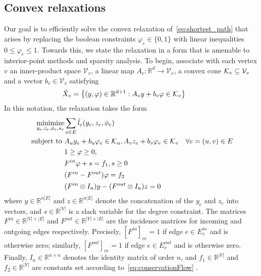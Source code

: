 \documentclass[letterpaper, 11pt]{article}
\begin{document}
\subsection{Convex relaxations}
Our goal is to efficiently solve the convex relaxation of~\eqref{eq:shortest_path}
that arises by replacing the boolean constraints $\varphi_e \in \{0, 1\}$ 
with linear inequalities $0 \le \varphi_e \le 1$. Towards this, we
state the relaxation in a form that is amenable to interior-point methods and sparsity 
analysis.   To begin, associate with each vertex $v$  an inner-product space $\mathcal{V}_v$,
a linear map $A_v : \mathbb{R}^{d} \rightarrow \mathcal{V}_e$, a
convex cone $\mathcal{K}_v \subseteq \mathcal{V}_v$ and a vector $b_v \in \mathcal{V}_v$ satisfying
\[
  \tilde X_v = \left\{ (y, \varphi) \in \mathbb{R}^{d+1} : A_v y  + b_v \varphi \in \mathcal{K}_v  \right\} \qquad
\]
In this notation, the relaxation takes the form
\begin{align}~\label{cp:coneRelax}
  \begin{aligned}
    \operatorname*{minimize}_{y_e, z_e, \phi_e, s_e} & \sum_{e \in E}\tilde l_e(y_e, z_e, \phi_e)\\
    \mbox{subject to } &A_u y_e + b_u \varphi_e \in \mathcal{K}_u ,  A_v z_e + b_v \varphi_e \in \mathcal{K}_v  & \forall e = (u, v) \in E \\
                      & 1 \ge \varphi \ge 0,  \\
                      & F^{in} \varphi  + s   = f_1, s \ge 0\\
                      & (F^{in} - F^{out}) \varphi  = f_2\\
                      & (F^{in} \otimes I_n)  y - (F^{out} \otimes I_n) z  = 0\\
  \end{aligned}
\end{align}
where $y \in \mathbb{R}^{ n |E|} $ and $z \in \mathbb{R}^{ n |E|}$ denote the concatenation of the $y_e$ and $z_e$
into vectors, and $s \in \mathbb{R}^{|V|}$ is a slack variable for the degree constraint. 
The matrices $F^{in} \in \mathbb{R}^{|V| \times |E|}$ 
and $F^{out} \in \mathbb{R}^{|V| \times |E|}$ are the incidence matrices for incoming and outgoing edges respectively.
Precisely, $[F^{in}]_{ve} = 1$ if edge $e \in E^{in}_{v}$ and is otherwise zero;
similarly, $[F^{out}]_{ve} = 1$ if edge $e \in E^{out}_{v}$ and is otherwise zero.
Finally, $I_n \in \mathbb{R}^{n \times n}$ denotes the identity matrix of order $n$,
and $f_1 \in \mathbb{R}^{|V|}$ and $f_2\in \mathbb{R}^{|V|}$ are constants set according to~\eqref{eq:conservationFlow} .
\end{document}
